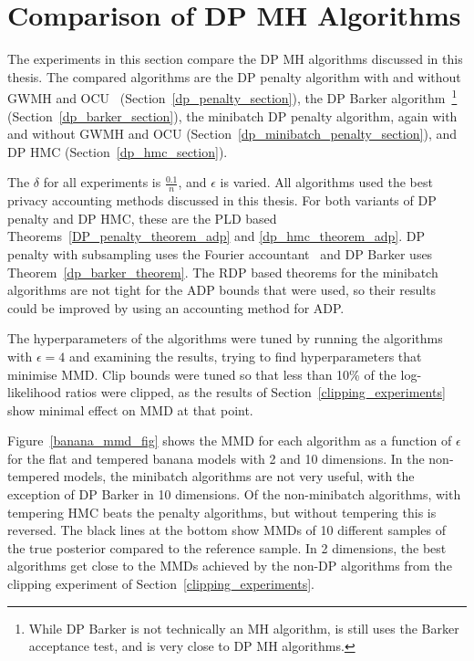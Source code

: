 \documentclass[english,twoside,openright]{HYgraduMLDS}
\begin{document}
\section{Comparison of DP MH Algorithms}\label{dp_mcmc_comparison}

The experiments in this section compare the DP MH algorithms discussed in this
thesis. The compared algorithms are the DP penalty algorithm with and without
GWMH and OCU~\cite{YildirimE19}
(Section~\ref{dp_penalty_section}), the DP Barker
algorithm~\cite{HeikkilaJDH19}\footnote{
  While DP Barker is not technically an MH algorithm, is still uses the
  Barker acceptance test, and is very close to DP MH algorithms.
}
(Section~\ref{dp_barker_section}), the minibatch DP penalty algorithm, again
with and without GWMH and OCU (Section~\ref{dp_minibatch_penalty_section}), and
DP HMC (Section~\ref{dp_hmc_section}).

The \(\delta\) for all experiments is \(\frac{0.1}{n}\), and \(\epsilon\) is
varied.
All algorithms used the best privacy accounting methods discussed in this thesis.
For both variants of DP penalty and DP HMC, these are the PLD based
Theorems~\ref{DP_penalty_theorem_adp} and \ref{dp_hmc_theorem_adp}.
DP penalty with subsampling uses the Fourier accountant~\cite{KJH20}
and DP Barker uses Theorem~\ref{dp_barker_theorem}. The RDP based theorems
for the minibatch algorithms are not tight for the ADP bounds that were used,
so their results could be improved by using an accounting method for ADP.

The hyperparameters of the algorithms
were tuned by running the algorithms with \(\epsilon = 4\) and examining the
results, trying to find hyperparameters that minimise MMD. Clip bounds were
tuned so that less than 10\% of the log-likelihood ratios were clipped,
as the results of Section~\ref{clipping_experiments} show minimal effect on
MMD at that point.

Figure~\ref{banana_mmd_fig} shows the MMD for each algorithm as a function of
\(\epsilon\) for the flat and tempered banana models with 2 and 10 dimensions.
In the non-tempered models, the minibatch algorithms are not very useful,
with the exception of DP Barker in 10 dimensions. Of the non-minibatch algorithms,
with tempering HMC beats the penalty algorithms, but without tempering this is
reversed. The black lines at the bottom show MMDs of 10 different samples of the
true posterior compared to the reference sample. In 2 dimensions, the best
algorithms get close to the MMDs achieved by the non-DP algorithms from
the clipping experiment of Section~\ref{clipping_experiments}.
\end{document}
